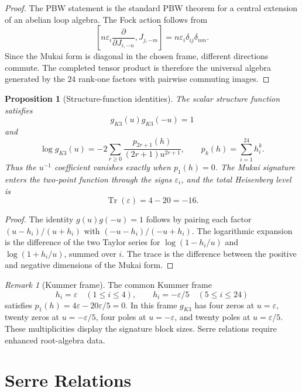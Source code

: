 \documentclass[11pt]{article}
\newtheorem{proposition}[theorem]{Proposition}
\theoremstyle{definition}
\theoremstyle{remark}
\newtheorem{remark}[theorem]{Remark}
\DeclareMathOperator{\Tr}{Tr}
\begin{document}
\begin{proof}
The PBW statement is the standard PBW theorem for a central extension
of an abelian loop algebra. The Fock action follows from
\[
  \left[
    n\varepsilon_i\frac{\partial}{\partial J_{i,-n}},
    J_{j,-m}
  \right]
  =
  n\varepsilon_i\delta_{ij}\delta_{nm}.
\]
Since the Mukai form is diagonal in the chosen frame, different
directions commute. The completed tensor product is therefore the
universal algebra generated by the $24$ rank-one factors with pairwise
commuting images.
\end{proof}

\begin{proposition}[Structure-function identities]
\label{prop:structure-function}
The scalar structure function satisfies
\[
  g_{K3}(u)g_{K3}(-u)=1
\]
and
\[
  \log g_{K3}(u)
  =
  -2\sum_{r\geq 0}
  \frac{p_{2r+1}(h)}{(2r+1)u^{2r+1}},
  \qquad
  p_k(h)=\sum_{i=1}^{24}h_i^k .
\]
Thus the $u^{-1}$ coefficient vanishes exactly when $p_1(h)=0$.
The Mukai signature enters the two-point function through the signs
$\varepsilon_i$, and the total Heisenberg level is
\[
  \Tr(\varepsilon)=4-20=-16 .
\]
\end{proposition}

\begin{proof}
The identity $g(u)g(-u)=1$ follows by pairing each factor
$(u-h_i)/(u+h_i)$ with $(-u-h_i)/(-u+h_i)$. The logarithmic expansion is
the difference of the two Taylor series for
$\log(1-h_i/u)$ and $\log(1+h_i/u)$, summed over $i$.
The trace is the difference between the positive and negative
dimensions of the Mukai form.
\end{proof}

\begin{remark}[Kummer frame]
\label{rem:kummer-frame}
The common Kummer frame
\[
  h_i=\varepsilon \quad (1\leq i\leq 4),
  \qquad
  h_i=-\varepsilon/5 \quad (5\leq i\leq 24)
\]
satisfies $p_1(h)=4\varepsilon-20\varepsilon/5=0$. In this frame
$g_{K3}$ has four zeros at $u=\varepsilon$, twenty zeros at
$u=-\varepsilon/5$, four poles at $u=-\varepsilon$, and twenty poles
at $u=\varepsilon/5$. These multiplicities display the signature block
sizes. Serre relations require enhanced root-algebra data.
\end{remark}

\section{Serre Relations}
\label{sec:serre-relations}
\end{document}
